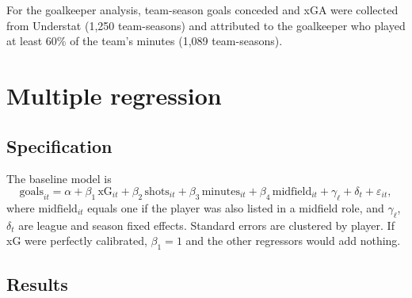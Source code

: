 \documentclass[11pt,a4paper]{article}
\begin{document}
For the goalkeeper analysis, team-season goals conceded and xGA were collected from Understat (1{,}250 team-seasons) and attributed to the goalkeeper who played at least 60\% of the team's minutes (1{,}089 team-seasons).

\section{Multiple regression}

\subsection{Specification}

The baseline model is
\begin{equation}
\text{goals}_{it} = \alpha + \beta_1\,\text{xG}_{it} + \beta_2\,\text{shots}_{it} + \beta_3\,\text{minutes}_{it} + \beta_4\,\text{midfield}_{it} + \gamma_{\ell} + \delta_t + \varepsilon_{it},
\end{equation}
where $\text{midfield}_{it}$ equals one if the player was also listed in a midfield role, and $\gamma_\ell$, $\delta_t$ are league and season fixed effects. Standard errors are clustered by player. If xG were perfectly calibrated, $\beta_1=1$ and the other regressors would add nothing.

\subsection{Results}
\end{document}
